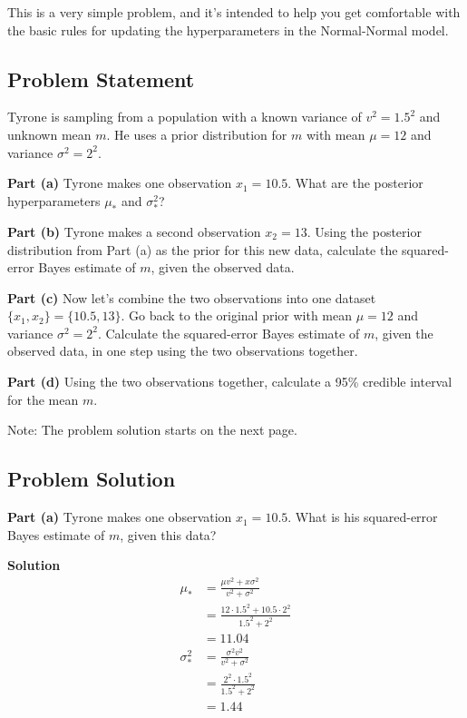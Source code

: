 \documentclass[12pt]{article}
\theoremstyle{definition}
\begin{document}
This is a very simple problem, and it's intended to help you get comfortable with the basic rules for updating the hyperparameters in the Normal-Normal model.


\subsection*{Problem Statement}

Tyrone is sampling from a population with a known variance of $v^2 = 1.5^2$ and unknown mean $m$. He uses a prior distribution for $m$ with mean $\mu = 12$ and variance $\sigma^2 = 2^2$.

\bigskip
\noindent
{\bf Part (a)} Tyrone makes one observation $x_1 = 10.5$. What are the posterior hyperparameters $\mu_*$ and $\sigma_*^2$?

\bigskip
\noindent
{\bf Part (b)} Tyrone makes a second observation $x_2 = 13$. Using the posterior distribution from Part (a) as the prior for this new data, calculate the squared-error Bayes estimate of $m$, given the observed data.

\bigskip
\noindent
{\bf Part (c)} Now let's combine the two observations into one dataset $\{x_1, x_2\} = \{10.5, 13\}$. Go back to the original prior with mean $\mu = 12$ and variance $\sigma^2 = 2^2$. Calculate the squared-error Bayes estimate of $m$, given the observed data, in one step using the two observations together.

\bigskip
\noindent
{\bf Part (d)} Using the two observations together, calculate a 95\% credible interval for the mean $m$.

\bigskip
\noindent
Note: The problem solution starts on the next page.

\newpage
\subsection*{Problem Solution}

\noindent
{\bf Part (a)} Tyrone makes one observation $x_1 = 10.5$. What is his squared-error Bayes estimate of $m$, given this data?

\bigskip
\noindent
{\bf Solution} 
\begin{align*}
\mu_* &= \frac{\mu v^2 + x\sigma^2}{v^2 + \sigma^2}\\
&= \frac{12 \cdot 1.5^2 + 10.5 \cdot 2^2}{1.5^2 + 2^2}\\
&= 11.04\\
\sigma^2_* &= \frac{\sigma^2 v^2}{v^2 + \sigma^2}\\
&= \frac{2^2 \cdot 1.5^2}{1.5^2 + 2^2}\\
&= 1.44
\end{align*}
\end{document}
